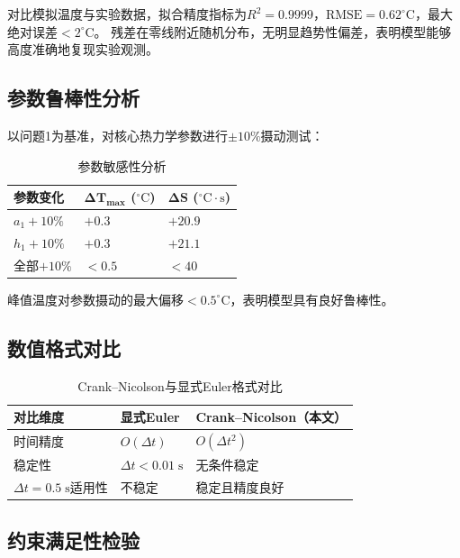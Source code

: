 \documentclass[12pt,a4paper]{ctexart}
\begin{document}
对比模拟温度与实验数据，拟合精度指标为$R^2=0.9999$，$\mathrm{RMSE}=0.62^{\circ}\mathrm{C}$，最大绝对误差$<2^{\circ}\mathrm{C}$。
残差在零线附近随机分布，无明显趋势性偏差，表明模型能够高度准确地复现实验观测。

\subsection{参数鲁棒性分析}

以问题1为基准，对核心热力学参数进行$\pm10\%$摄动测试：

\begin{table}[H]
\centering
\caption{参数敏感性分析}
\label{tab:sensitivity}
\begin{tabularx}{\textwidth}{YYY}
\toprule
\textbf{参数变化} & $\boldsymbol{\Delta T_{\max}}$ ($^{\circ}\mathrm{C}$) & $\boldsymbol{\Delta S}$ ($^{\circ}\mathrm{C}\!\cdot\!\mathrm{s}$) \\
\midrule
$a_1 +10\%$ & $+0.3$ & $+20.9$ \\
$h_1 +10\%$ & $+0.3$ & $+21.1$ \\
全部$+10\%$ & $<0.5$ & $<40$ \\
\bottomrule
\end{tabularx}
\end{table}

峰值温度对参数摄动的最大偏移$<0.5^{\circ}\mathrm{C}$，表明模型具有良好鲁棒性。

\subsection{数值格式对比}

\begin{table}[H]
\centering
\caption{Crank--Nicolson与显式Euler格式对比}
\label{tab:method_compare}
\begin{tabularx}{\textwidth}{YYY}
\toprule
\textbf{对比维度} & \textbf{显式Euler} & \textbf{Crank--Nicolson（本文）} \\
\midrule
时间精度 & $O(\Delta t)$ & $O(\Delta t^2)$ \\
稳定性   & $\Delta t < 0.01\;\mathrm{s}$ & 无条件稳定 \\
$\Delta t=0.5\;\mathrm{s}$适用性 & 不稳定 & 稳定且精度良好 \\
\bottomrule
\end{tabularx}
\end{table}

\subsection{约束满足性检验}
\end{document}
